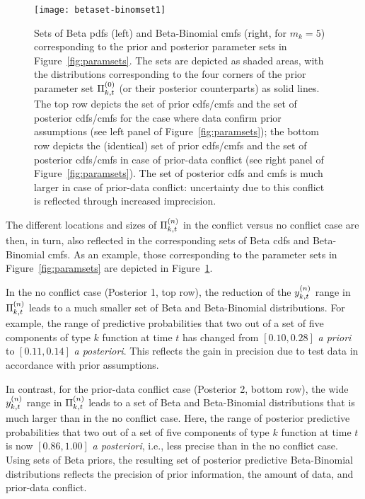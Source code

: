\documentclass[12pt, a4paper]{elsarticle}
\begin{document}
\begin{figure}
\texttt{[image: betaset-binomset1]}
\caption{Sets of Beta pdfs (left) and Beta-Binomial cmfs (right, for $m_k=5$)
corresponding to the prior and posterior parameter sets in Figure~\ref{fig:paramsets}.
The sets are depicted as shaded areas,
with the distributions corresponding to the four corners
of the prior parameter set $\Pi^{(0)}_{k,t}$ (or their posterior counterparts) as solid lines.
The top row depicts the set of prior cdfs/cmfs and the set of posterior cdfs/cmfs for the case where data confirm prior assumptions
(see left panel of Figure~\ref{fig:paramsets});
the bottom row depicts the (identical) set of prior cdfs/cmfs and the set of posterior cdfs/cmfs in case of prior-data conflict
(see right panel of Figure~\ref{fig:paramsets}).
The set of posterior cdfs and cmfs
is much larger in case of prior-data conflict:
uncertainty due to this conflict is reflected through increased imprecision.}
\label{fig:betaset-binomset}
\end{figure}

The different locations and sizes of $\Pi^{(n)}_{k,t}$ in the conflict versus no conflict case are then, in turn,
also reflected in the corresponding sets of Beta cdfs and Beta-Binomial cmfs.
As an example, those corresponding to the parameter sets in Figure~\ref{fig:paramsets}
are depicted in Figure~\ref{fig:betaset-binomset}.

In the no conflict case (Posterior 1, top row),
the reduction of the $y^{(n)}_{k,t}$ range in $\Pi^{(n)}_{k,t}$ leads to a much smaller set
of Beta and Beta-Binomial distributions.
For example, the range of predictive probabilities
that two out of a set of five components of type $k$ function at time $t$ 
has changed from $[0.10, 0.28]$ \emph{a priori} to $[0.11,0.14]$ \emph{a posteriori}.
This reflects the gain in precision due to test data in accordance with prior assumptions.

In contrast, for the prior-data conflict case (Posterior 2, bottom row),
the wide $y^{(n)}_{k,t}$ range in $\Pi^{(n)}_{k,t}$ leads to a set of Beta and Beta-Binomial distributions
that is much larger than in the no conflict case.
Here, the range of posterior predictive probabilities
that two out of a set of five components of type $k$ function at time $t$
is now $[0.86, 1.00]$ \emph{a posteriori}, i.e., less precise than in the no conflict case.
Using sets of Beta priors, the resulting set of posterior predictive Beta-Binomial distributions
reflects the precision of prior information,
the amount of data, and prior-data conflict.
\end{document}
